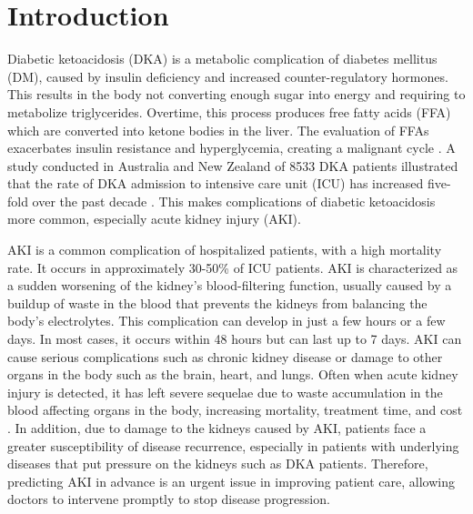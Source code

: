 \documentclass[sn-mathphys-num]{sn-jnl}%
\theoremstyle{thmstyleone}%
\theoremstyle{thmstyletwo}%
\theoremstyle{thmstylethree}%
\begin{document}
\section{Introduction}
\label{sec1}
Diabetic ketoacidosis (DKA) is a metabolic complication of diabetes mellitus (DM), caused by insulin deficiency and increased counter-regulatory hormones.
This results in the body not converting enough sugar into energy and requiring to metabolize triglycerides.
Overtime, this process produces free fatty acids (FFA) which are converted into ketone bodies in the liver.
The evaluation of FFAs exacerbates insulin resistance and hyperglycemia, creating a malignant cycle \cite{dka-info}.
A study conducted in Australia and New Zealand of 8533 DKA patients illustrated that the rate of DKA admission to intensive care unit (ICU) has increased five-fold over the past decade \cite{aus+nz-dka-icu-increase}.
This makes complications of diabetic ketoacidosis more common, especially acute kidney injury (AKI).

AKI is a common complication of hospitalized patients, with a high mortality rate.
It occurs in approximately 30-50\% of ICU patients.
AKI is characterized as a sudden worsening of the kidney's blood-filtering function, usually caused by a buildup of waste in the blood that prevents the kidneys from balancing the body's electrolytes.
This complication can develop in just a few hours or a few days.
In most cases, it occurs within 48 hours but can last up to 7 days.
AKI can cause serious complications such as chronic kidney disease or damage to other organs in the body such as the brain, heart, and lungs.
Often when acute kidney injury is detected, it has left severe sequelae due to waste accumulation in the blood affecting organs in the body, increasing mortality, treatment time, and cost \cite{kdigo-aki-guideline}.
In addition, due to damage to the kidneys caused by AKI, patients face a greater susceptibility of disease recurrence, especially in patients with underlying diseases that put pressure on the kidneys such as DKA patients.
Therefore, predicting AKI in advance is an urgent issue in improving patient care, allowing doctors to intervene promptly to stop disease progression.
\end{document}
